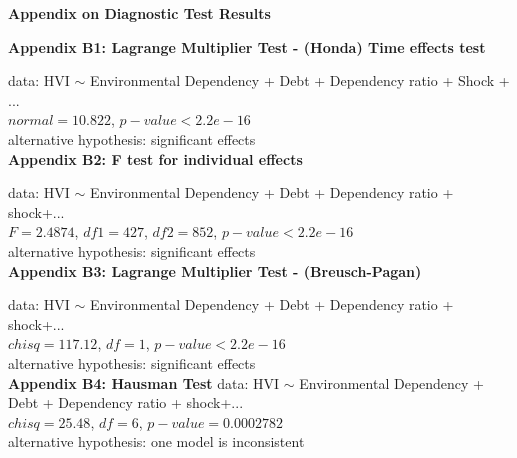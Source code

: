 \begin{center}
	\textbf{Appendix on Diagnostic Test Results}
\end{center}
\textbf{Appendix B1:
	Lagrange Multiplier Test - (Honda) Time effects test}

data:  HVI $ \sim $ Environmental Dependency + Debt + Dependency ratio + Shock +  ...\\
\hspace{2cm}$normal = 10.822$, $p-value <2.2e-16$\\
\hspace{2cm}alternative hypothesis: significant effects\\

\textbf{Appendix B2:
	F test for individual effects}

data:  HVI $ \sim $ Environmental Dependency + Debt + Dependency ratio + shock+...\\
$F = 2.4874$, $df1 = 427$, $df2 = 852$, $p-value < 2.2e-16$\\
alternative hypothesis: significant effects\\

\textbf{Appendix B3: Lagrange Multiplier Test - (Breusch-Pagan)}

data:  HVI $ \sim $ Environmental Dependency + Debt + Dependency ratio + shock+...\\
$chisq = 117.12$, $df = 1$, $p-value < 2.2e-16$\\
alternative hypothesis: significant effects\\

\textbf{Appendix B4: Hausman Test}
data:  HVI $ \sim $ Environmental Dependency + Debt + Dependency ratio + shock+...\\
$chisq = 25.48$, $df = 6$, $p-value = 0.0002782$\\
alternative hypothesis: one model is inconsistent\\